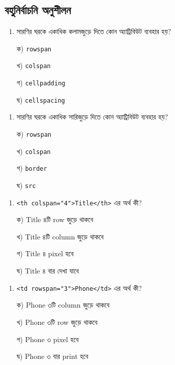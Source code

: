 \subsection{বহুনির্বাচনি অনুশীলন}

\par\addvspace{4pt}\noindent
\begin{minipage}[t]{.48\linewidth}\vspace{0pt}
\begin{enumerate}[start=1,leftmargin=*,topsep=0pt,itemsep=0pt]
\item সারণির ঘরকে একাধিক কলামজুড়ে দিতে কোন অ্যাট্রিবিউট ব্যবহার হয়?
\par ক) \texttt{rowspan}
\par খ) \texttt{colspan}
\par গ) \texttt{cellpadding}
\par ঘ) \texttt{cellspacing}
\end{enumerate}
\end{minipage}\hfill
\begin{minipage}[t]{.48\linewidth}\vspace{0pt}
\begin{enumerate}[start=2,leftmargin=*,topsep=0pt,itemsep=0pt]
\item সারণির ঘরকে একাধিক সারিজুড়ে দিতে কোন অ্যাট্রিবিউট ব্যবহার হয়?
\par ক) \texttt{rowspan}
\par খ) \texttt{colspan}
\par গ) \texttt{border}
\par ঘ) \texttt{src}
\end{enumerate}
\end{minipage}
\par
\par\addvspace{4pt}\noindent
\begin{minipage}[t]{.48\linewidth}\vspace{0pt}
\begin{enumerate}[start=3,leftmargin=*,topsep=0pt,itemsep=0pt]
\item \texttt{<th colspan="4">Title</th>} এর অর্থ কী?
\par ক) Title ৪টি row জুড়ে থাকবে
\par খ) Title ৪টি column জুড়ে থাকবে
\par গ) Title ৪ pixel হবে
\par ঘ) Title ৪ বার দেখা যাবে
\end{enumerate}
\end{minipage}\hfill
\begin{minipage}[t]{.48\linewidth}\vspace{0pt}
\begin{enumerate}[start=4,leftmargin=*,topsep=0pt,itemsep=0pt]
\item \texttt{<td rowspan="3">Phone</td>} এর অর্থ কী?
\par ক) Phone ৩টি column জুড়ে থাকবে
\par খ) Phone ৩টি row জুড়ে থাকবে
\par গ) Phone ৩ pixel হবে
\par ঘ) Phone ৩ বার print হবে
\end{enumerate}
\end{minipage}
